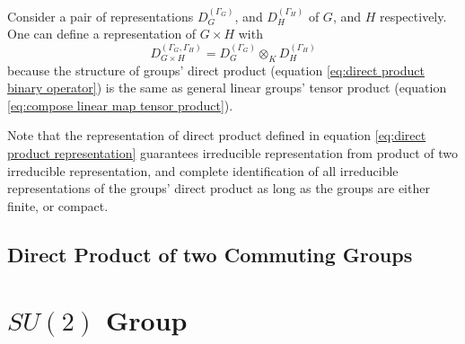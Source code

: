 \documentclass[preprint, 12pt]{revtex4-2}
\numberwithin{equation}{section}
\begin{document}
Consider a pair of representations $D^{(\Gamma_G)}_G$, and $D^{(\Gamma_H)}_H$ of $G$, and $H$ respectively. One can define a representation of $G\times H$ with
\begin{equation}\label{eq:direct product representation}
    D^{(\Gamma_G,\Gamma_H)}_{G\times H} = D^{(\Gamma_G)}_G\otimes_K D^{(\Gamma_H)}_H
\end{equation}
because the structure of groups' direct product (equation \ref{eq:direct product binary operator}) is the same as general linear groups' tensor product (equation \ref{eq:compose linear map tensor product}).

Note that the representation of direct product defined in equation \ref{eq:direct product representation} guarantees irreducible representation from product of two irreducible representation, and complete identification of all irreducible representations of the groups' direct product as long as the groups are either finite, or compact.  

\subsection{}

\subsection{Direct Product of two Commuting Groups}


\newpage
\section{$SU(2)$ Group}
\end{document}
